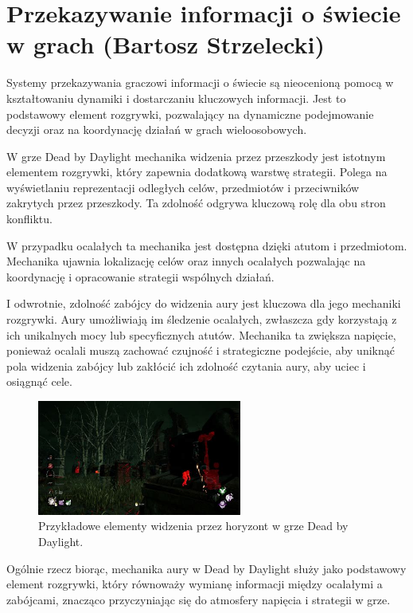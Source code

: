 \section{Przekazywanie informacji o świecie w grach (Bartosz Strzelecki)}\label{chap:dbd}
Systemy przekazywania graczowi informacji o świecie są nieocenioną pomocą w kształtowaniu dynamiki i dostarczaniu kluczowych informacji.
Jest to podstawowy element rozgrywki, pozwalający na dynamiczne podejmowanie decyzji oraz na koordynację działań w grach wieloosobowych.

W grze Dead by Daylight mechanika widzenia przez przeszkody jest istotnym elementem rozgrywki, który
zapewnia dodatkową warstwę strategii. Polega na wyświetlaniu reprezentacji odległych celów, przedmiotów i przeciwników
zakrytych przez przeszkody. Ta zdolność odgrywa kluczową rolę dla obu stron konfliktu.

W przypadku ocalałych ta mechanika jest dostępna dzięki atutom i przedmiotom. Mechanika ujawnia lokalizację celów oraz
innych ocalałych pozwalając na koordynację i opracowanie strategii wspólnych działań.

I odwrotnie, zdolność zabójcy do widzenia aury jest kluczowa dla jego mechaniki rozgrywki.
Aury umożliwiają im śledzenie ocalałych, zwłaszcza gdy korzystają z ich unikalnych mocy lub specyficznych atutów. 
Mechanika ta zwiększa napięcie, ponieważ ocalali muszą zachować czujność i strategiczne podejście, 
aby uniknąć pola widzenia zabójcy lub zakłócić ich zdolność czytania aury, aby uciec i osiągnąć cele.

\begin{figure}[h]
\centering
\includegraphics[width=0.6\textwidth]{images/aura}
\caption{Przykładowe elementy widzenia przez horyzont w grze Dead by Daylight.}
\end{figure}

Ogólnie rzecz biorąc, mechanika aury w Dead by Daylight służy jako podstawowy element rozgrywki,
który równoważy wymianę informacji między ocalałymi a zabójcami, znacząco przyczyniając się do atmosfery napięcia i strategii w grze.


